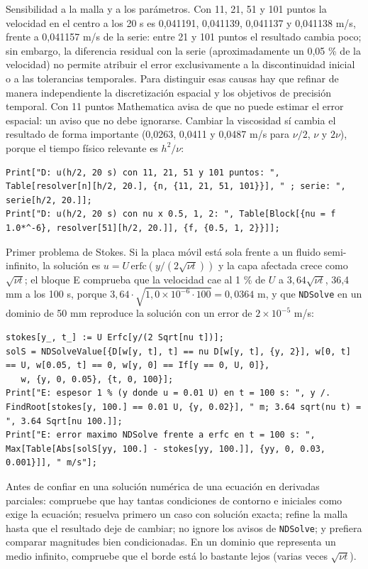 \documentclass[10pt,openany]{book}
\begin{document}
Sensibilidad a la malla y a los parámetros. Con 11, 21, 51 y 101 puntos la velocidad en el centro a los 20 s es 0,041191, 0,041139, 0,041137 y 0,041138 m/s, frente a 0,041157 m/s de la serie: entre 21 y 101 puntos el resultado cambia poco; sin embargo, la diferencia residual con la serie (aproximadamente un 0,05 \% de la velocidad) no permite atribuir el error exclusivamente a la discontinuidad inicial o a las tolerancias temporales. Para distinguir esas causas hay que refinar de manera independiente la discretización espacial y los objetivos de precisión temporal. Con 11 puntos Mathematica avisa de que no puede estimar el error espacial: un aviso que no debe ignorarse. Cambiar la viscosidad sí cambia el resultado de forma importante (0,0263, 0,0411 y 0,0487 m/s para \(\nu/2\), \(\nu\) y \(2\nu\)), porque el tiempo físico relevante es \(h^{2}/\nu\):
\begin{lstlisting}[style=studium]
Print["D: u(h/2, 20 s) con 11, 21, 51 y 101 puntos: ", Table[resolver[n][h/2, 20.], {n, {11, 21, 51, 101}}], " ; serie: ", serie[h/2, 20.]];
Print["D: u(h/2, 20 s) con nu x 0.5, 1, 2: ", Table[Block[{nu = f 1.0*^-6}, resolver[51][h/2, 20.]], {f, {0.5, 1, 2}}]];
\end{lstlisting}
Primer problema de Stokes. Si la placa móvil está sola frente a un fluido semi-infinito, la solución es \(u = U\,\mathrm{erfc}\!\left(y/(2\sqrt{\nu t})\right)\) y la capa afectada crece como \(\sqrt{\nu t}\); el bloque E comprueba que la velocidad cae al 1 \% de \(U\) a \(3{,}64\sqrt{\nu t}\), 36,4 mm a los 100 s, porque \(3{,}64\cdot\sqrt{1{,}0\times 10^{-6}\cdot 100} = 0{,}0364\) m, y que \texttt{NDSolve} en un dominio de 50 mm reproduce la solución con un error de \(2\times 10^{-5}\) m/s:
\begin{lstlisting}[style=studium]
stokes[y_, t_] := U Erfc[y/(2 Sqrt[nu t])];
solS = NDSolveValue[{D[w[y, t], t] == nu D[w[y, t], {y, 2}], w[0, t] == U, w[0.05, t] == 0, w[y, 0] == If[y == 0, U, 0]},
   w, {y, 0, 0.05}, {t, 0, 100}];
Print["E: espesor 1 % (y donde u = 0.01 U) en t = 100 s: ", y /. FindRoot[stokes[y, 100.] == 0.01 U, {y, 0.02}], " m; 3.64 sqrt(nu t) = ", 3.64 Sqrt[nu 100.]];
Print["E: error maximo NDSolve frente a erfc en t = 100 s: ", Max[Table[Abs[solS[yy, 100.] - stokes[yy, 100.]], {yy, 0, 0.03, 0.001}]], " m/s"];
\end{lstlisting}

\begin{tcolorbox}[title={Consejo}, studiumtip, breakable]

Antes de confiar en una solución numérica de una ecuación en derivadas parciales: compruebe que hay tantas condiciones de contorno e iniciales como exige la ecuación; resuelva primero un caso con solución exacta; refine la malla hasta que el resultado deje de cambiar; no ignore los avisos de \texttt{NDSolve}; y prefiera comparar magnitudes bien condicionadas. En un dominio que representa un medio infinito, compruebe que el borde está lo bastante lejos (varias veces \(\sqrt{\nu t}\)).
\end{tcolorbox}
\end{document}
